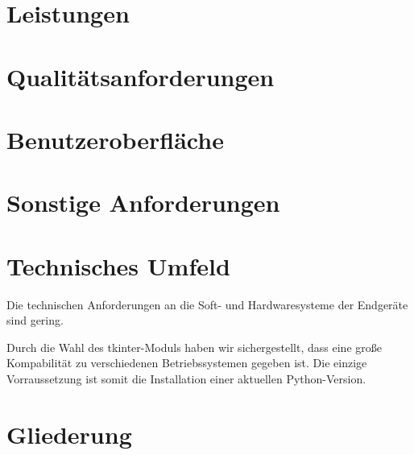 \documentclass[14pt]{scrartcl}
\begin{document}
\section{Leistungen}

\section{Qualitätsanforderungen}

\section{Benutzeroberfläche}



\section{Sonstige Anforderungen}
\section{Technisches Umfeld}

Die technischen Anforderungen an die Soft- und Hardwaresysteme der Endgeräte sind gering.\par
Durch die Wahl des tkinter-Moduls haben wir sichergestellt, dass eine große Kompabilität zu verschiedenen Betriebssystemen gegeben ist. Die einzige Vorraussetzung ist
somit die Installation einer aktuellen Python-Version.\par 

\newpage
\section{Gliederung}
\end{document}
